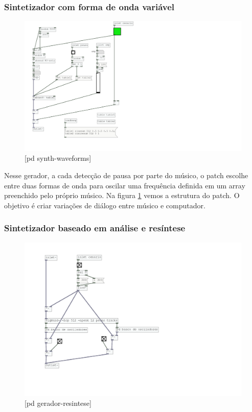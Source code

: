 \documentclass{ppgmus}
\begin{document}
\subsubsection{Sintetizador com forma de onda variável}

\begin{figure}
\includegraphics[scale=.6]{gerador-sintese-waveform}
\caption{[pd synth-waveforms]}
\label{geradorwaveform}
\end{figure}


Nesse gerador, a cada detecção de pausa por parte do músico, o 
patch escolhe entre duas formas de onda para oscilar uma frequência 
definida em um array preenchido pelo próprio músico. Na figura
\ref{geradorwaveform} vemos a estrutura do patch. O objetivo
é criar variações de diálogo entre músico e computador.



\subsubsection{Sintetizador baseado em análise e resíntese}

\begin{figure}
\includegraphics[scale=.6]{gerador-resintese}
\caption{[pd gerador-resintese]}
\label{geradorresintese}
\end{figure}
\end{document}
